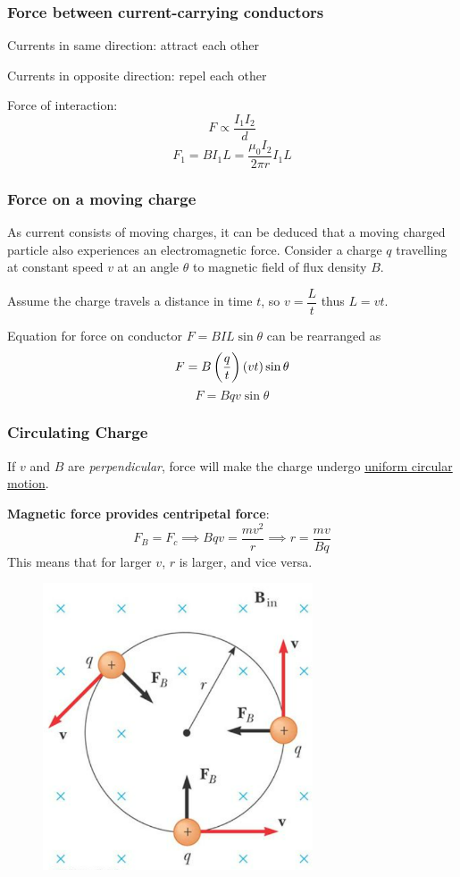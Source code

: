 \subsubsection{Force between current-carrying conductors}
Currents in same direction: attract each other

Currents in opposite direction: repel each other

Force of interaction:
\[ F \propto \frac{I_1I_2}{d} \]
\begin{equation}
F_1 = BI_1L = \frac{\mu_0I_2}{2\pi r}I_1L
\end{equation}

\subsubsection{Force on a moving charge}
As current consists of moving charges, it can be deduced that a moving charged particle also experiences an electromagnetic force. Consider a charge $q$ travelling at constant speed $v$ at an angle $\theta$ to magnetic field of flux density $B$.

Assume the charge travels a distance in time $t$, so $v=\dfrac{L}{t}$ thus $L=vt$.

Equation for force on conductor $F=BIL\sin\theta$ can be rearranged as
\[ F = B\left(\frac{q}{t}\right)(vt)\sin\theta \]
\begin{equation}
F = Bqv\sin\theta
\end{equation}

\subsubsection{Circulating Charge}
If $v$ and $B$ are \emph{perpendicular}, force will make the charge undergo \underline{uniform circular motion}.

\textbf{Magnetic force provides centripetal force}:
\[ F_B = F_c \implies Bqv = \frac{mv^2}{r} \implies \boxed{r=\frac{mv}{Bq}} \]
This means that for larger $v$, $r$ is larger, and vice versa.

\begin{figure}[H]
    \centering
    \includegraphics[width=8cm]{images/b_field_circularmotion.png}
\end{figure}

